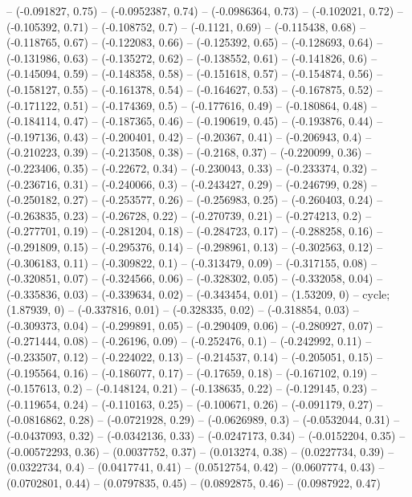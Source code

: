 -- (-0.091827, 0.75)
-- (-0.0952387, 0.74)
-- (-0.0986364, 0.73)
-- (-0.102021, 0.72)
-- (-0.105392, 0.71)
-- (-0.108752, 0.7)
-- (-0.1121, 0.69)
-- (-0.115438, 0.68)
-- (-0.118765, 0.67)
-- (-0.122083, 0.66)
-- (-0.125392, 0.65)
-- (-0.128693, 0.64)
-- (-0.131986, 0.63)
-- (-0.135272, 0.62)
-- (-0.138552, 0.61)
-- (-0.141826, 0.6)
-- (-0.145094, 0.59)
-- (-0.148358, 0.58)
-- (-0.151618, 0.57)
-- (-0.154874, 0.56)
-- (-0.158127, 0.55)
-- (-0.161378, 0.54)
-- (-0.164627, 0.53)
-- (-0.167875, 0.52)
-- (-0.171122, 0.51)
-- (-0.174369, 0.5)
-- (-0.177616, 0.49)
-- (-0.180864, 0.48)
-- (-0.184114, 0.47)
-- (-0.187365, 0.46)
-- (-0.190619, 0.45)
-- (-0.193876, 0.44)
-- (-0.197136, 0.43)
-- (-0.200401, 0.42)
-- (-0.20367, 0.41)
-- (-0.206943, 0.4)
-- (-0.210223, 0.39)
-- (-0.213508, 0.38)
-- (-0.2168, 0.37)
-- (-0.220099, 0.36)
-- (-0.223406, 0.35)
-- (-0.22672, 0.34)
-- (-0.230043, 0.33)
-- (-0.233374, 0.32)
-- (-0.236716, 0.31)
-- (-0.240066, 0.3)
-- (-0.243427, 0.29)
-- (-0.246799, 0.28)
-- (-0.250182, 0.27)
-- (-0.253577, 0.26)
-- (-0.256983, 0.25)
-- (-0.260403, 0.24)
-- (-0.263835, 0.23)
-- (-0.26728, 0.22)
-- (-0.270739, 0.21)
-- (-0.274213, 0.2)
-- (-0.277701, 0.19)
-- (-0.281204, 0.18)
-- (-0.284723, 0.17)
-- (-0.288258, 0.16)
-- (-0.291809, 0.15)
-- (-0.295376, 0.14)
-- (-0.298961, 0.13)
-- (-0.302563, 0.12)
-- (-0.306183, 0.11)
-- (-0.309822, 0.1)
-- (-0.313479, 0.09)
-- (-0.317155, 0.08)
-- (-0.320851, 0.07)
-- (-0.324566, 0.06)
-- (-0.328302, 0.05)
-- (-0.332058, 0.04)
-- (-0.335836, 0.03)
-- (-0.339634, 0.02)
-- (-0.343454, 0.01)
-- (1.53209, 0)
-- cycle;
\drawBand (1.87939, 0)
-- (-0.337816, 0.01)
-- (-0.328335, 0.02)
-- (-0.318854, 0.03)
-- (-0.309373, 0.04)
-- (-0.299891, 0.05)
-- (-0.290409, 0.06)
-- (-0.280927, 0.07)
-- (-0.271444, 0.08)
-- (-0.26196, 0.09)
-- (-0.252476, 0.1)
-- (-0.242992, 0.11)
-- (-0.233507, 0.12)
-- (-0.224022, 0.13)
-- (-0.214537, 0.14)
-- (-0.205051, 0.15)
-- (-0.195564, 0.16)
-- (-0.186077, 0.17)
-- (-0.17659, 0.18)
-- (-0.167102, 0.19)
-- (-0.157613, 0.2)
-- (-0.148124, 0.21)
-- (-0.138635, 0.22)
-- (-0.129145, 0.23)
-- (-0.119654, 0.24)
-- (-0.110163, 0.25)
-- (-0.100671, 0.26)
-- (-0.091179, 0.27)
-- (-0.0816862, 0.28)
-- (-0.0721928, 0.29)
-- (-0.0626989, 0.3)
-- (-0.0532044, 0.31)
-- (-0.0437093, 0.32)
-- (-0.0342136, 0.33)
-- (-0.0247173, 0.34)
-- (-0.0152204, 0.35)
-- (-0.00572293, 0.36)
-- (0.0037752, 0.37)
-- (0.013274, 0.38)
-- (0.0227734, 0.39)
-- (0.0322734, 0.4)
-- (0.0417741, 0.41)
-- (0.0512754, 0.42)
-- (0.0607774, 0.43)
-- (0.0702801, 0.44)
-- (0.0797835, 0.45)
-- (0.0892875, 0.46)
-- (0.0987922, 0.47)
